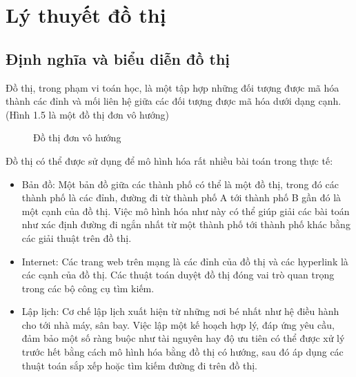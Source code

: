 \section{Lý thuyết đồ thị}
\subsection{Định nghĩa và biểu diễn đồ thị}
Đồ thị, trong phạm vi toán học, là một tập hợp những đối tượng được mã hóa thành các đỉnh và mối liên hệ giữa các đối tượng được mã hóa dưới dạng cạnh. (Hình 1.5 là một đồ thị đơn vô hướng)
\linebreak 
\begin{figure}[htb]
	\caption{\label{fig:my-label} Đồ thị đơn vô hướng}
\end{figure}
\linebreak 
Đồ thị có thể được sử dụng để mô hình hóa rất nhiều bài toán trong thực tế:\cite{the_algorithms}
\begin{itemize}
\item Bản đồ: Một bản đồ giữa các thành phố có thể là một đồ thị, trong đó các thành phố là các đỉnh, đường đi từ thành phố A tới thành phố B gần đó là một cạnh của đồ thị. Việc mô hình hóa như này có thể giúp giải các bài toán như xác định đường đi ngắn nhất từ một thành phố tới thành phố khác bằng các giải thuật trên đồ thị.
\item Internet: Các trang web trên mạng là các đỉnh của đồ thị và các hyperlink là các cạnh của đồ thị. Các thuật toán duyệt đồ thị đóng vai trò quan trọng trong các bộ công cụ tìm kiếm.
\item Lập lịch: Cơ chế lập lịch xuất hiện từ những nơi bé nhất như hệ điều hành cho tới nhà máy, sân bay. Việc lập một kế hoạch hợp lý, đáp ứng yêu cầu, đảm bảo một số ràng buộc như tài nguyên hay độ ưu tiên có thể được xử lý trước hết bằng cách mô hình hóa bằng đồ thị có hướng, sau đó áp dụng các thuật toán sắp xếp hoặc tìm kiếm đường đi trên đồ thị.
\end{itemize}
